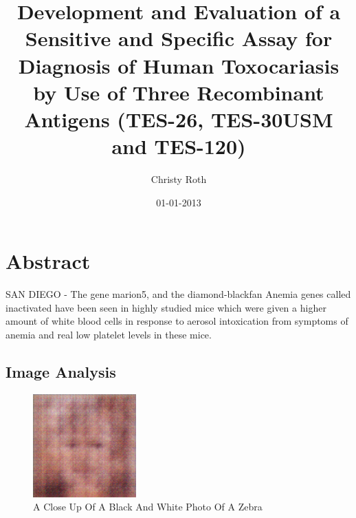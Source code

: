 \documentclass{article}%
\title{Development and Evaluation of a Sensitive and Specific Assay for Diagnosis of Human Toxocariasis by Use of Three Recombinant Antigens (TES{-}26, TES{-}30USM and TES{-}120)}%
\author{Christy Roth}%
\affil{Department of Pharmacology, National Medicines Institute, Warsaw, Poland}%
\date{01{-}01{-}2013}%
\begin{document}
%
\normalsize%
\maketitle%
\section{Abstract}%
\label{sec:Abstract}%
SAN DIEGO {-} The gene\newline%
marion5, and the\newline%
diamond{-}blackfan Anemia\newline%
genes called inactivated\newline%
have been seen in\newline%
highly studied mice\newline%
which\newline%
were given a higher\newline%
amount of white blood cells\newline%
in response to\newline%
aerosol intoxication\newline%
from\newline%
symptoms of anemia\newline%
and\newline%
real low platelet\newline%
levels in\newline%
these mice.

%
\subsection{Image Analysis}%
\label{subsec:ImageAnalysis}%


\begin{figure}[h!]%
\centering%
\includegraphics[width=150px]{500_fake_images/samples_5_66.png}%
\caption{A Close Up Of A Black And White Photo Of A Zebra}%
\end{figure}

%
\end{document}
